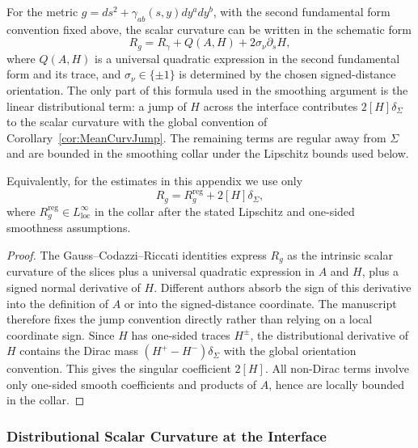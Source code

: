 \begin{theorem}
\label{thm:ScalarFermiExplicit}
For the metric $g = ds^2 + \gamma_{ab}(s, y) dy^a dy^b$, with the second fundamental form convention fixed above, the scalar curvature can be written in the schematic form
\begin{equation}
\label{eq:ScalarFermiExact}
R_g = R_\gamma + Q(A,H) + 2\sigma_\nu \partial_s H,
\end{equation}
where \(Q(A,H)\) is a universal quadratic expression in the second fundamental form and its trace, and \(\sigma_\nu\in\{\pm1\}\) is determined by the chosen signed-distance orientation. The only part of this formula used in the smoothing argument is the linear distributional term: a jump of \(H\) across the interface contributes \(2[H]\delta_\Sigma\) to the scalar curvature with the global convention of Corollary~\ref{cor:MeanCurvJump}. The remaining terms are regular away from \(\Sigma\) and are bounded in the smoothing collar under the Lipschitz bounds used below.

Equivalently, for the estimates in this appendix we use only
\begin{equation}
\label{eq:ScalarFermiSimplified}
R_g = R^{\mathrm{reg}}_g + 2[H]\delta_\Sigma ,
\end{equation}
where \(R^{\mathrm{reg}}_g\in L^\infty_{\mathrm{loc}}\) in the collar after the stated Lipschitz and one-sided smoothness assumptions.
\end{theorem}

\begin{proof}
The Gauss--Codazzi--Riccati identities express \(R_g\) as the intrinsic scalar curvature of the slices plus a universal quadratic expression in \(A\) and \(H\), plus a signed normal derivative of \(H\). Different authors absorb the sign of this derivative into the definition of \(A\) or into the signed-distance coordinate. The manuscript therefore fixes the jump convention directly rather than relying on a local coordinate sign. Since \(H\) has one-sided traces \(H^\pm\), the distributional derivative of \(H\) contains the Dirac mass \((H^+-H^-)\delta_\Sigma\) with the global orientation convention. This gives the singular coefficient \(2[H]\). All non-Dirac terms involve only one-sided smooth coefficients and products of \(A\), hence are locally bounded in the collar.
\end{proof}

\subsubsection{Distributional Scalar Curvature at the Interface}

